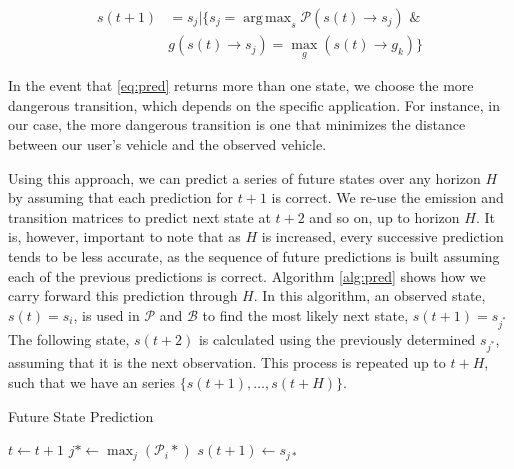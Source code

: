 \documentclass[letterpaper, 10 pt, conference]{ieeeconf}  %
\DeclareMathOperator*{\argmax}{arg\,max}
\newcommand\NB[1]{$\spadesuit$\footnote{NB: #1}}
\begin{document}
\begin{align} \label{eq:pred}
   s(t+1) &= s_j \vert \{s_j = \argmax_s \mathcal{P}(s(t)\to s_j) \text{ \& } \nonumber \\ 
   & g(s(t)\to s_j) = \max_g(s(t)\to g_k)\}
\end{align}


In the event that \eqref{eq:pred} returns more than one state, we choose the more dangerous transition, which depends on the specific application. For instance, in our case, the more dangerous transition is one that minimizes the distance between our user's vehicle and the observed vehicle.

Using this approach, we can predict a series of future states over any horizon $H$ by assuming that each prediction for $t+1$ is correct. We re-use the emission and transition matrices to predict next state at $t+2$ and so on, up to horizon $H$. It is, however, important to note that as $H$ is increased, every successive prediction tends to be less accurate, as the sequence of future predictions is built assuming each of the previous predictions is correct.
Algorithm \ref{alg:pred} shows how we carry forward this prediction through $H$.%
In this algorithm, an observed state, $s(t) = s_i$, is used in %
$\mathcal P$ and $\mathcal B$ to find the most likely next state, $s(t+1) = s_{j^*}$ %
The following state, $s(t+2)$ is calculated using the previously determined $s_{j^*}$, assuming that it is the next observation. This process is repeated up to $t+H$, such that we have an series $\{s(t+1),\ldots,s(t+H)\}$.

\begin{algorithm}[ht!]
\caption{Future State Prediction} \label{alg:pred}
\begin{algorithmic}[1]
\STATE $t \gets t+1$
\STATE $j* \gets \max_j(\mathcal{P}_{i}*)$
\ENDFOR
\STATE $s(t+1) \gets s_{j*}$
\ENDWHILE
\end{algorithmic}
\end{algorithm}
\end{document}
